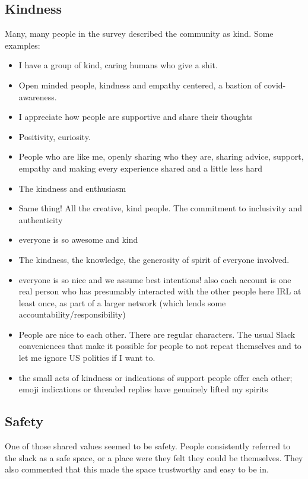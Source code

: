 \documentclass[
]{book}
\providecommand{\tightlist}{%
  \setlength{\itemsep}{0pt}\setlength{\parskip}{0pt}}
\begin{document}
\subsection{Kindness}\label{kindness}

Many, many people in the survey described the community as kind. Some examples:

\begin{itemize}
\tightlist
\item
  I have a group of kind, caring humans who give a shit.
\item
  Open minded people, kindness and empathy centered, a bastion of covid-awareness.
\item
  I appreciate how people are supportive and share their thoughts
\item
  Positivity, curiosity.
\item
  People who are like me, openly sharing who they are, sharing advice, support, empathy and making every experience shared and a little less hard
\item
  The kindness and enthusiasm
\item
  Same thing! All the creative, kind people. The commitment to inclusivity and authenticity
\item
  everyone is so awesome and kind
\item
  The kindness, the knowledge, the generosity of spirit of everyone involved.
\item
  everyone is so nice and we assume best intentions! also each account is one real person who has presumably interacted with the other people here IRL at least once, as part of a larger network (which lends some accountability/responsibility)
\item
  People are nice to each other. There are regular characters. The usual Slack conveniences that make it possible for people to not repeat themselves and to let me ignore US politics if I want to.
\item
  the small acts of kindness or indications of support people offer each other; emoji indications or threaded replies have genuinely lifted my spirits
\end{itemize}

\subsection{Safety}\label{safety}

One of those shared values seemed to be safety. People consistently referred to the slack as a safe space, or a place were they felt they could be themselves. They also commented that this made the space trustworthy and easy to be in.
\end{document}

